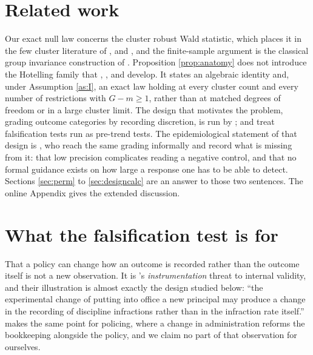 \documentclass[12pt]{article}
\theoremstyle{definition}
\numberwithin{equation}{section}
\begin{document}
\section{Related work}

Our exact null law concerns the cluster robust Wald statistic, which places it
in the few cluster literature of \citet{cameron2008bootstrap},
\citet{mackinnon2017wild} and \citet{carter2017cluster}, and the finite-sample argument is the classical group invariance construction of
\citet{lehmann2005testing}. Proposition \ref{prop:anatomy} does not introduce
the Hotelling family that \citet{bester2011cluster}, \citet{bell2002bias},
\citet{tipton2015small} and \citet{pustejovsky2018small} develop. It states an
algebraic identity and, under Assumption \ref{as:I}, an exact law holding at
every cluster count and every number of restrictions with $G - m \ge 1$, rather
than at matched degrees of freedom or in a large cluster limit. The design that
motivates the problem, grading outcome categories by recording discretion, is
run by \citet{weisburd2024crs}; \citet{roth2022pretest} and
\citet{rambachan2023credible} treat falsification tests run as pre-trend tests.
The epidemiological statement of that design is
\citet{nunez2025detection}, who reach the same grading informally and record
what is missing from it: that low precision complicates reading a negative
control, and that no formal guidance exists on how large a response one has to
be able to detect. Sections \ref{sec:perm} to \ref{sec:designcalc} are an
answer to those two sentences.
The online Appendix gives the extended discussion.

\section{What the falsification test is for}
\label{sec:why}

That a policy can change how an outcome is recorded rather than the outcome
itself is not a new observation. It is \citet{campbell1963experimental}'s
\emph{instrumentation} threat to internal validity, and their illustration is
almost exactly the design studied below: ``the experimental change of putting
into office a new principal may produce a change in the recording of discipline
infractions rather than in the infraction rate itself.''
\citet{campbell1969reforms} makes the same point for policing, where a change in
administration reforms the bookkeeping alongside the policy, and we claim no part
of that observation for ourselves.
\end{document}
